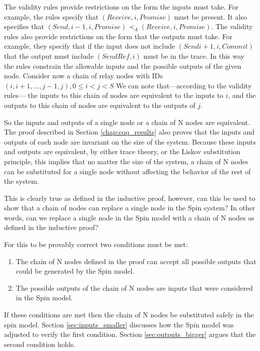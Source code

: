 \documentclass[runningheads]{llncs}
\newcommand{\happensbefore}{\prec_A}
\begin{document}
The validity rules provide restrictions on the form the inputs must take. For example, the rules specify that $(Receive, i, Promise)$ must be present. It also specifies that  $(Send, i-1, i, Promise) \happensbefore (Receive, i, Promise)$. The validity rules also provide restrictions on the form that the outputs must take. For example, they specify that if the input does not include $(Send i+1, i, Commit)$ that the output must include $(SendRef, i)$ must be in the trace. In this way the rules constrain the allowable inputs and the possible outputs of the given node.
Consider now a chain of relay nodes with IDs $(i, i+1, ..., j-1, j), 0 \le i < j < S$ We can note that---according to the validity rules--- the inputs to this chain of nodes are equivalent to the inputs to $i$, and the outputs to this chain of nodes are equivalent to the outputs of $j$. 

So the inputs and outputs of a single node or a chain of N nodes are equivalent. The proof described in Section \ref{chap:coq_results} also proves that the inputs and outputs of each node are invariant on the size of the system. Because these inputs and outputs are equivalent, by either trace theory, or the Liskov substitution principle, this implies that no matter the size of the system, a chain of N nodes can be substituted for a single node without affecting the behavior of the rest of the system.

This is clearly true as defined in the inductive proof, however, can this be used to show that a chain of nodes can replace a single node in the Spin system? In other words, can we replace a single node in the Spin model with a chain of N nodes as defined in the inductive proof?

For this to be provably correct two conditions must be met:
\begin{enumerate}
    \item The chain of N nodes defined in the proof can accept all possible outputs that could be generated by the Spin model.
    \item The possible outputs of the chain of N nodes are inputs that were considered in the Spin model. 
\end{enumerate}

If these conditions are met then the chain of N nodes be substituted safely in the spin model. Section \ref{sec:inputs_smaller} discusses how the Spin model was adjusted to verify the first condition. Section \ref{sec:outputs_bigger} argues that the second condition holds.
\end{document}
